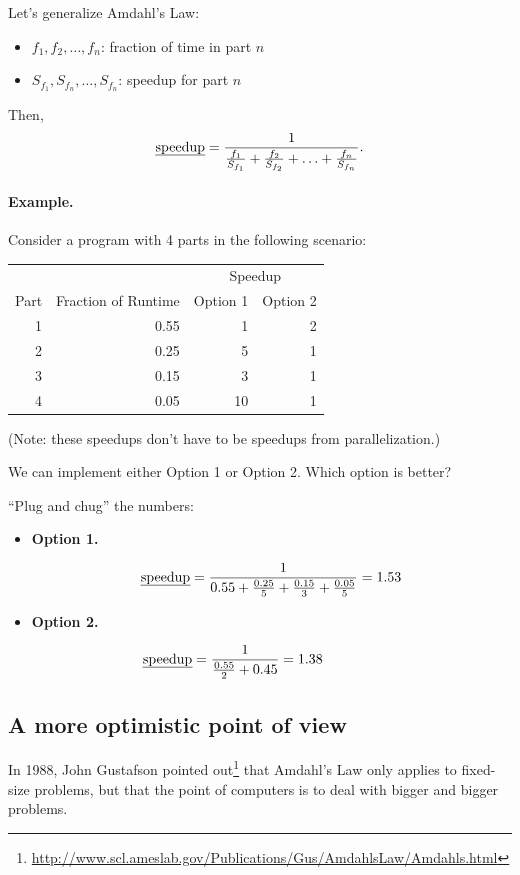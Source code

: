 Let's generalize Amdahl's Law:

\begin{itemize}
\item  $f_1, f_2, \ldots, f_n$: fraction of time in part $n$
\item  $S_{f_1}, S_{f_n}, \ldots, S_{f_n}$: speedup for part $n$
\end{itemize}

Then,
\[\mbox{\em speedup} = \frac{1}{\frac{f_1}{S_{f_1}} + \frac{f_2}{S_{f_2}} + \ldots +
     \frac{f_n}{S_{f_n}}}.\]

\paragraph{Example.} Consider a program with 4 parts in the following scenario:

\begin{center}
     \begin{tabular}{r|r|r|r}
     \multicolumn{2}{l}{} & \multicolumn{2}{|c}{Speedup} \\
     Part & Fraction of Runtime & Option 1 & Option 2\\
     \hline
     1 & 0.55 & 1  & 2\\
     2 & 0.25 & 5  & 1\\
     3 & 0.15 & 3  & 1\\
     4 & 0.05  & 10 & 1\\
     \end{tabular}
 \end{center}

     (Note: these speedups don't have to be speedups from parallelization.)
    
   We can implement either Option 1 or Option 2. 
   Which option is better?

   ``Plug and chug'' the numbers:
 \begin{itemize}
 \item  {\bf Option 1.}

   \[ \mbox{\em speedup} = \frac{1}{0.55 + \frac{0.25}{5} + \frac{0.15}{3} + \frac{0.05}{5}}
     = 1.53  \]

 \item  {\bf Option 2.}

   \[\mbox{\em speedup} = \frac{1}{\frac{0.55}{2} + 0.45} = 1.38 \hspace*{5.5em}\]
\end{itemize}

\subsection*{A more optimistic point of view}
In 1988, John Gustafson pointed
out\footnote{\url{http://www.scl.ameslab.gov/Publications/Gus/AmdahlsLaw/Amdahls.html}}
that Amdahl's Law only applies to fixed-size problems, but that the
point of computers is to deal with bigger and bigger problems.

